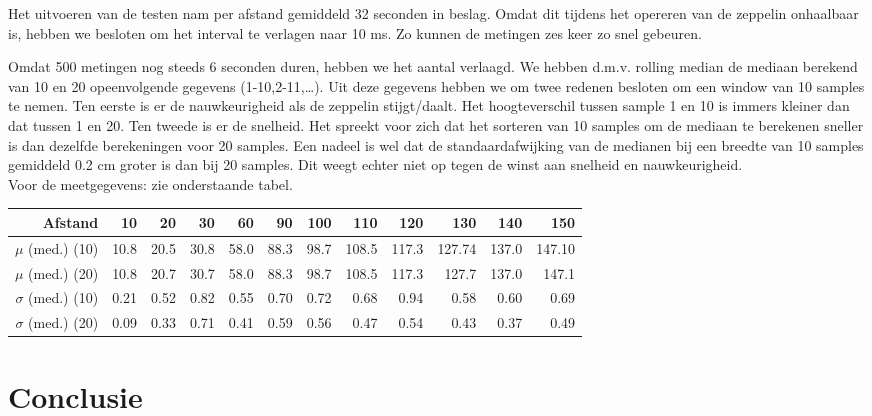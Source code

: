 \documentclass{peno-opdracht3}
\begin{document}
Het uitvoeren van de testen nam per afstand gemiddeld 32 seconden in beslag. Omdat dit tijdens het opereren van de zeppelin onhaalbaar is, hebben we besloten om het interval te verlagen naar 10 ms. Zo kunnen de metingen zes keer zo snel gebeuren. 

Omdat 500 metingen nog steeds 6 seconden duren, hebben we het aantal verlaagd. We hebben d.m.v. rolling median de mediaan berekend van 10 en 20 opeenvolgende gegevens (1-10,2-11,\ldots). Uit deze gegevens hebben we om twee redenen besloten om een window van 10 samples te nemen.  Ten eerste is er de nauwkeurigheid als de zeppelin stijgt/daalt. Het hoogteverschil tussen sample 1 en 10 is immers kleiner dan dat tussen 1 en 20. Ten tweede is er de snelheid. Het spreekt voor zich dat het sorteren van 10 samples om de mediaan te berekenen sneller is dan dezelfde berekeningen voor 20 samples. Een nadeel is wel dat de standaardafwijking van de medianen bij een breedte van 10 samples gemiddeld 0.2 cm groter is dan bij 20 samples. Dit weegt echter niet op tegen de winst aan snelheid en nauwkeurigheid.\\ 

Voor de meetgegevens: zie onderstaande tabel. \\

\begin{tabular}{r||r|r|r|r|r|r|r|r|r|r|r}
\textbf{Afstand} & 10 & 20 & 30 & 60 & 90 & 100 & 110 & 120 & 130 & 140 & 150 \\
\hline \hline 
$\mu$ (med.) (10) & 10.8 & 20.5 & 30.8 & 58.0 & 88.3 & 98.7 & 108.5 & 117.3 & 127.74 & 137.0 & 147.10 \\
$\mu$ (med.) (20) & 10.8 & 20.7 & 30.7 & 58.0 & 88.3 & 98.7 & 108.5 & 117.3 & 127.7 & 137.0 & 147.1 \\
$\sigma$ (med.) (10) & 0.21 & 0.52 & 0.82 & 0.55 & 0.70 & 0.72 & 0.68 & 0.94 & 0.58 & 0.60 & 0.69 \\
$\sigma$ (med.) (20)& 0.09 & 0.33 & 0.71 & 0.41 & 0.59 & 0.56 & 0.47 & 0.54 & 0.43 & 0.37 & 0.49 \\
\end{tabular}
\section{Conclusie}
\end{document}
